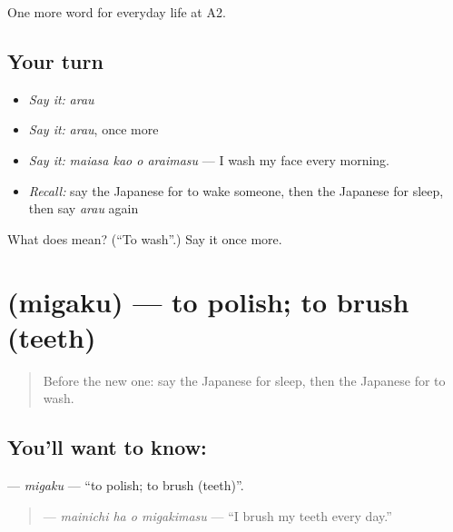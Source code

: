 \begin{grammarlens}[title={What you've built}]
One more word for everyday life at A2.
\end{grammarlens}

\subsection*{Your turn}
\begin{itemize}
\raggedright
  \item \emph{Say it:} \emph{arau}
  \item \emph{Say it:} \emph{arau}, once more
  \item \emph{Say it:} \emph{maiasa kao o araimasu} — I wash my face every morning.
  \item \emph{Recall:} say the Japanese for to wake someone, then the Japanese for sleep, then say \emph{arau} again
\end{itemize}

\begin{tcolorbox}[breakable,colback=teal!4,colframe=teal!35!black,title={Before you move on}]
What does  mean? (\textquotedblleft{}To wash\textquotedblright{}.) Say it once more.
\end{tcolorbox}
\section[\texorpdfstring{\ja{みがく} (migaku)}{みがく (migaku)}]{ (migaku) — to polish; to brush (teeth)}

\label{lesson:JA-C147-migaku}



\begin{quote}
Before the new one: say the Japanese for sleep, then the Japanese for to wash.
\end{quote}

\subsection*{You'll want to know: }
\textbf{} — \emph{migaku} — \textquotedblleft{}to polish; to brush (teeth)\textquotedblright{}.

\begin{quote}
\textbf{  } — \emph{mainichi ha o migakimasu} — \textquotedblleft{}I brush my teeth every day.\textquotedblright{}
\end{quote}

